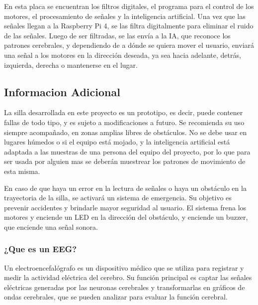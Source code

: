 \documentclass{article}
\begin{document}
En esta placa se encuentran los filtros digitales, el programa para el control de los motores, el procesamiento de señales y la inteligencia artificial. Una vez que las señales llegan a la Raspberry Pi 4, se las filtra digitalmente para eliminar el ruido de las señales. Luego de ser filtradas, se las envía a la IA, que reconoce los patrones cerebrales, y dependiendo de a dónde se quiera mover el usuario, enviará una señal a los motores en la dirección deseada, ya sea hacia adelante, detrás, izquierda, derecha o mantenerse en el lugar.


\subsection {Informacion Adicional}
La silla desarrollada en este proyecto es un prototipo, es decir, puede contener fallas de todo tipo, y es sujeto a modificaciones a futuro. Se recomienda su uso siempre acompañado, en zonas amplias libres de obstáculos. No se debe usar en lugares húmedos o si el equipo está mojado, y la inteligencia artificial está adaptada a las muestras de una persona del equipo del proyecto, por lo que para ser usada por alguien mas se deberán muestrear los patrones de movimiento de esta misma.

En caso de que haya un error en la lectura de señales o haya un obstáculo en la trayectoria de la silla, se activará un sistema de emergencia. Su objetivo es prevenir accidentes y brindarle mayor seguridad al usuario. El sistema frena los motores y enciende un LED en la dirección del obstáculo, y enciende un buzzer, que enciende una señal sonora.

\subsubsection{¿Que es un EEG?}

Un electroencefalógrafo es un dispositivo médico que se utiliza para registrar y medir la actividad eléctrica del cerebro. Su función principal es captar las señales eléctricas generadas por las neuronas cerebrales y transformarlas en gráficos de ondas cerebrales, que se pueden analizar para evaluar la función cerebral.
\end{document}
